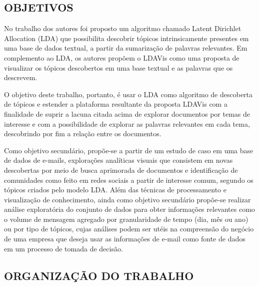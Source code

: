 \documentclass[12pt,a4paper]{article}
\begin{document}
\subsection{OBJETIVOS} \label{sec:objetivo}

No trabalho dos autores  foi proposto um algoritmo chamado Latent Dirichlet Allocation (LDA) \cite{blei2003latent} que possibilita descobrir tópicos intrinsicamente presentes em uma base de dados textual, a partir da sumarização de palavras relevantes. Em complemento ao LDA, os autores   propõem o LDAVis como uma proposta de visualizar os tópicos descobertos em uma base textual e as palavras que os descrevem. 

O objetivo deste trabalho, portanto, é usar o LDA como algoritmo de descoberta de tópicos e estender a plataforma resultante da proposta LDAVis com a finalidade de suprir a lacuna citada acima de explorar documentos por temas de interesse e com a possibilidade de explorar as palavras relevantes em cada tema, descobrindo por fim a relação entre os documentos.

Como objetivo secundário, propõe-se a partir de um estudo de caso em uma base de dados de e-mails, explorações analíticas visuais que consistem em novas descobertas por meio de busca aprimorada de documentos e identificação de  comunidades como feito em redes  sociais a partir de interesse comum, segundo os tópicos criados pelo modelo LDA. Além das técnicas de processamento e visualização de conhecimento, ainda como objetivo secundário propõe-se realizar análise exploratória do conjunto de dados para obter informações relevantes como o volume de mensagem agregado por granularidade de tempo (dia, mês ou ano) ou por tipo de tópicos, cujas análises podem ser utéis na compreensão do negócio de uma empresa que deseja usar as informações de e-mail como fonte de dados em um processo de tomada de decisão.


\subsection{ORGANIZAÇÃO DO TRABALHO} \label{sec:organizacao}
\end{document}
